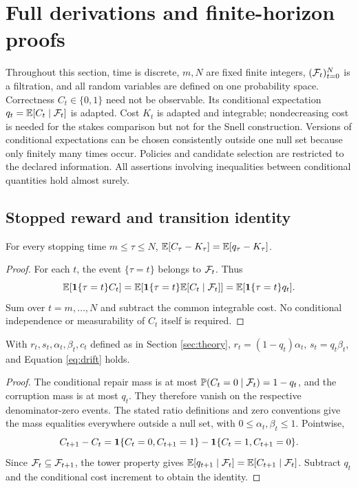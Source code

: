 \section{Full derivations and finite-horizon proofs}
\label{app:proofs}

Throughout this section, time is discrete, \(m,N\) are fixed finite integers,
\((\mathcal F_t)_{t=0}^N\) is a filtration, and all random variables are defined on one
probability space. Correctness \(C_t\in\{0,1\}\) need not be observable.
Its conditional expectation \(q_t=\mathbb E[C_t\mid\mathcal F_t]\) is adapted. Cost \(K_t\)
is adapted and integrable; nondecreasing cost is needed for the stakes
comparison but not for the Snell construction. Versions of conditional
expectations can be chosen consistently outside one null set because only
finitely many times occur. Policies and candidate selection are restricted
to the declared information. All assertions involving inequalities between
conditional quantities hold almost surely.

\subsection{Stopped reward and transition identity}
\begin{lemma}
\label{lem:reduction-full}
For every stopping time \(m\le\tau\le N\),
\(\mathbb E[C_\tau-K_\tau]=\mathbb E[q_\tau-K_\tau]\).
\end{lemma}
\begin{proof}
For each \(t\), the event \(\{\tau=t\}\) belongs to \(\mathcal F_t\). Thus
\[
 \mathbb E[\mathbf 1\{\tau=t\}C_t]
 =\mathbb E[\mathbf 1\{\tau=t\}\mathbb E[C_t\mid\mathcal F_t]]
 =\mathbb E[\mathbf 1\{\tau=t\}q_t].
\]
Sum over \(t=m,\ldots,N\) and subtract the common integrable cost.
No conditional independence or measurability of \(C_t\) itself is required.
\end{proof}

\begin{lemma}
\label{lem:drift-full}
With \(r_t,s_t,\alpha_t,\beta_t,c_t\) defined as in
Section \ref{sec:theory}, \(r_t=(1-q_t)\alpha_t\),
\(s_t=q_t\beta_t\), and Equation \eqref{eq:drift} holds.
\end{lemma}
\begin{proof}
The conditional repair mass is at most
\(\mathbb P(C_t=0\mid\mathcal F_t)=1-q_t\), and the corruption mass is at most \(q_t\).
They therefore vanish on the respective denominator-zero events. The stated
ratio definitions and zero conventions give the mass equalities everywhere
outside a null set, with \(0\le\alpha_t,\beta_t\le1\). Pointwise,
\[
 C_{t+1}-C_t
 =\mathbf 1\{C_t=0,C_{t+1}=1\}
  -\mathbf 1\{C_t=1,C_{t+1}=0\}.
\]
Since \(\mathcal F_t\subseteq\mathcal F_{t+1}\), the tower property gives
\(\mathbb E[q_{t+1}\mid\mathcal F_t]=\mathbb E[C_{t+1}\mid\mathcal F_t]\).
Subtract \(q_t\) and the conditional cost increment to obtain the identity.
\end{proof}


